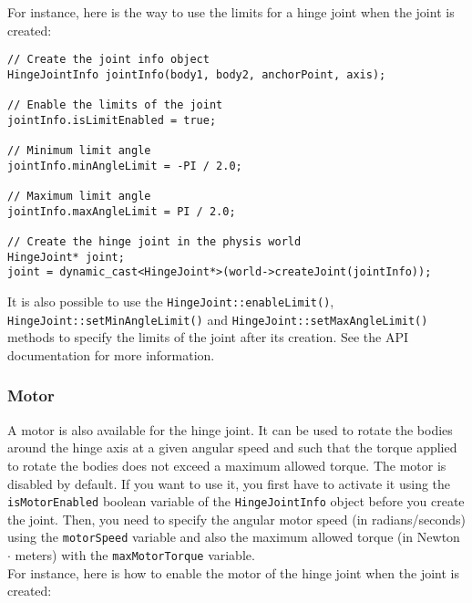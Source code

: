 \documentclass[a4paper,12pt]{article}
\begin{document}
     For instance, here is the way to use the limits for a hinge joint when the joint is created: \\

     \begin{lstlisting}
// Create the joint info object
HingeJointInfo jointInfo(body1, body2, anchorPoint, axis);

// Enable the limits of the joint
jointInfo.isLimitEnabled = true;

// Minimum limit angle
jointInfo.minAngleLimit = -PI / 2.0;

// Maximum limit angle
jointInfo.maxAngleLimit = PI / 2.0;

// Create the hinge joint in the physis world
HingeJoint* joint;
joint = dynamic_cast<HingeJoint*>(world->createJoint(jointInfo));
  \end{lstlisting}

     \vspace{0.6cm}

     \begin{sloppypar}
        It is also possible to use the \texttt{HingeJoint::enableLimit()}, \texttt{HingeJoint::setMinAngleLimit()} and \texttt{HingeJoint::setMaxAngleLimit()} methods to specify
        the limits of the joint after its creation. See the API documentation for more information.
     \end{sloppypar}

     \subsubsection{Motor}

     A motor is also available for the hinge joint. It can be used to rotate the bodies around the hinge axis at a given angular speed and such that the torque applied to
     rotate the bodies does not exceed a maximum allowed torque. The motor is disabled by default. If you want to use it, you first have to activate it using the
     \texttt{isMotorEnabled} boolean variable of the \texttt{HingeJointInfo} object before you create the joint. Then, you need to specify the angular motor speed (in radians/seconds)
     using the \texttt{motorSpeed} variable and also the maximum allowed torque (in Newton $\cdot$ meters) with the \texttt{maxMotorTorque} variable. \\

     For instance, here is how to enable the motor of the hinge joint when the joint is created: \\
\end{document}
